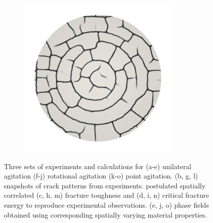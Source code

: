 \begin{figure}[htb!]
\begin{subfigure}{0.15\textwidth}
    \caption{}
  \end{subfigure}
  \begin{subfigure}{0.15\textwidth}
    \includegraphics[width=\textwidth]{Chapter4/figures/2D/d_ring.png}
    \caption{}
  \end{subfigure}
  \caption[Three sets of experiments and calculations with different modes of agitation.]{Three sets of experiments and calculations for (a-e) unilateral agitation (f-j) rotational agitation (k-o) point agitation. (b, g, l) snapshots of crack patterns from experiments. postulated spatially correlated (c, h, m) fracture toughness and (d, i, n) critical fracture energy to reproduce experimental observations. (e, j, o) phase fields obtained using corresponding spatially varying material properties. }
  \label{fig: Chapter4/2D/japanese_experiments}
\end{figure}

